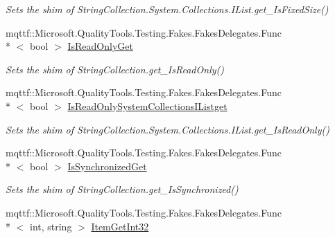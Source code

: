 \begin{DoxyCompactItemize}
\begin{DoxyCompactList}\small\item\em Sets the shim of String\-Collection.\-System.\-Collections.\-I\-List.\-get\-\_\-\-Is\-Fixed\-Size()\end{DoxyCompactList}\item 
mqttf\-::\-Microsoft.\-Quality\-Tools.\-Testing.\-Fakes.\-Fakes\-Delegates.\-Func\\*
$<$ bool $>$ \hyperlink{class_system_1_1_collections_1_1_specialized_1_1_fakes_1_1_shim_string_collection_a4211c9904e9045db2f6e3df2055e7b00}{Is\-Read\-Only\-Get}
\begin{DoxyCompactList}\small\item\em Sets the shim of String\-Collection.\-get\-\_\-\-Is\-Read\-Only()\end{DoxyCompactList}\item 
mqttf\-::\-Microsoft.\-Quality\-Tools.\-Testing.\-Fakes.\-Fakes\-Delegates.\-Func\\*
$<$ bool $>$ \hyperlink{class_system_1_1_collections_1_1_specialized_1_1_fakes_1_1_shim_string_collection_ad5691a9109b6143e5fc690814574e4c2}{Is\-Read\-Only\-System\-Collections\-I\-Listget}
\begin{DoxyCompactList}\small\item\em Sets the shim of String\-Collection.\-System.\-Collections.\-I\-List.\-get\-\_\-\-Is\-Read\-Only()\end{DoxyCompactList}\item 
mqttf\-::\-Microsoft.\-Quality\-Tools.\-Testing.\-Fakes.\-Fakes\-Delegates.\-Func\\*
$<$ bool $>$ \hyperlink{class_system_1_1_collections_1_1_specialized_1_1_fakes_1_1_shim_string_collection_ad1af8348b03b3b2f217d2b7db0700be4}{Is\-Synchronized\-Get}
\begin{DoxyCompactList}\small\item\em Sets the shim of String\-Collection.\-get\-\_\-\-Is\-Synchronized()\end{DoxyCompactList}\item 
mqttf\-::\-Microsoft.\-Quality\-Tools.\-Testing.\-Fakes.\-Fakes\-Delegates.\-Func\\*
$<$ int, string $>$ \hyperlink{class_system_1_1_collections_1_1_specialized_1_1_fakes_1_1_shim_string_collection_afe4b2a8674ba6c6ec5c0d57cf8c3bb17}{Item\-Get\-Int32}

\end{DoxyCompactItemize}
